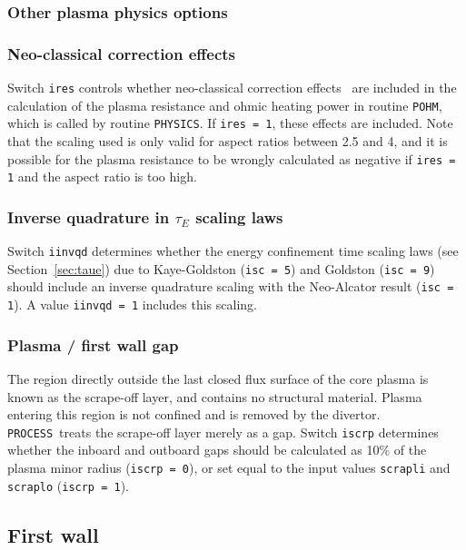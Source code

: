 \documentclass[11pt,a4paper]{report}
\newcommand{\process}{\mbox{\texttt{PROCESS}}}
\begin{document}
\subsubsection{Other plasma physics options}

\subsubsection*{Neo-classical correction effects}

Switch \texttt{ires} controls whether neo-classical correction
effects~\cite{Uckan} are included in the calculation of the plasma resistance
and ohmic heating power in routine \texttt{POHM}, which is called by routine
\texttt{PHYSICS}. If \texttt{ires = 1}, these effects are included. Note that
the scaling used is only valid for aspect ratios between 2.5 and 4, and it is
possible for the plasma resistance to be wrongly calculated as negative if
\texttt{ires = 1} and the aspect ratio is too high.

\subsubsection*{Inverse quadrature in $\tau_E$ scaling laws}

Switch \texttt{iinvqd} determines whether the energy confinement time scaling
laws (see Section~\ref{sec:taue}) due to Kaye-Goldston (\texttt{isc = 5}) and
Goldston (\texttt{isc = 9}) should include an inverse quadrature scaling with
the Neo-Alcator result (\texttt{isc = 1}). A value \texttt{iinvqd = 1}
includes this scaling.

\subsubsection*{Plasma / first wall gap}

The region directly outside the last closed flux surface of the core plasma is
known as the scrape-off layer, and contains no structural material.  Plasma
entering this region is not confined and is removed by the divertor. \process\
treats the scrape-off layer merely as a gap. Switch \texttt{iscrp} determines
whether the inboard and outboard gaps should be calculated as 10\% of the
plasma minor radius (\texttt{iscrp = 0}), or set equal to the input values
\texttt{scrapli} and \texttt{scraplo} (\texttt{iscrp = 1}).

\subsection{First wall}
\end{document}
